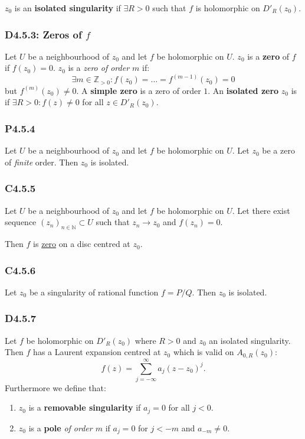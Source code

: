 \documentclass{article}
\begin{document}
\begin{multicols*}{3}
$z_0$ is an \textbf{isolated singularity} if $\exists R>0$
such that $f$ is holomorphic on $D'_R(z_0)$.

\subsubsection*{D4.5.3: Zeros of $f$}
Let $U$ be a neighbourhood of $z_0$ and let $f$ be holomorphic on $U$.
$z_0$ is a \textbf{zero} of $f$ if $f(z_0)=0$.
$z_0$ is a \textit{zero of order $m$} if:
$$\exists m\in\mathbb{Z}_{>0}:f(z_0)=\dots=f^{(m-1)}(z_0)=0$$
but $f^{(m)}(z_0)\neq0$. A \textbf{simple zero} is a zero of order $1$.
An \textbf{isolated zero} $z_0$ is if $\exists R>0:f(z)\neq0$ for all
$z\in D'_R(z_0)$.

\subsubsection*{P4.5.4}
Let $U$ be a neighbourhood of $z_0$ and let $f$ be holomorphic
on $U$. Let $z_0$ be a zero of \textit{finite} order.
Then $z_0$ is isolated.

\subsubsection*{C4.5.5}
Let $U$ be a neighbourhood of $z_0$ and let $f$ be holomorphic
on $U$. Let there exist sequence $(z_n)_{n\in\mathbb{N}}\subset U$
such that $z_n\rightarrow z_0$ and $f(z_n)=0$. 

Then $f$ is \underline{zero} on a disc centred at $z_0$.

\subsubsection*{C4.5.6}
Let $z_0$ be a singularity of rational function $f=P/Q$.
Then $z_0$ is isolated.

\subsubsection*{D4.5.7}
Let $f$ be holomorphic on $D'_R(z_0)$ where $R>0$
and $z_0$ an isolated singularity. Then $f$ has a Laurent
expansion centred at $z_0$ which is valid on $A_{0,R}(z_0)$:
$$f(z)=\sum_{j=-\infty}^{\infty}a_j(z-z_0)^j.$$
Furthermore we define that:
\begin{enumerate}
    \item $z_0$ is a \textbf{removable singularity} if
    $a_j=0$ for all $j<0$.

    \item $z_0$ is a \textbf{pole} \textit{of order $m$} if
    $a_j=0$ for $j<-m$ and $a_{-m}\neq0$.


\end{enumerate}
\end{multicols*}
\end{document}
